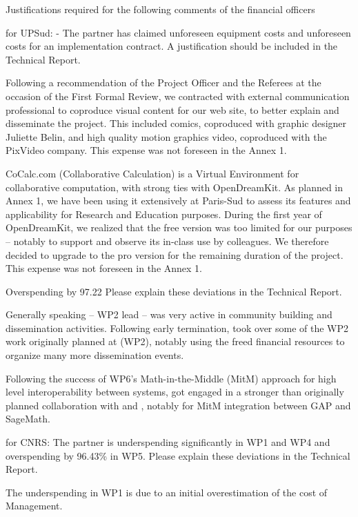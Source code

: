 
Justifications required for the following comments of the financial officers 

for UPSud:
- The partner has claimed unforeseen equipment costs and unforeseen costs for an
implementation contract. A justification should be included in the Technical Report.

Following a recommendation of the Project Officer and the Referees at
the occasion of the First Formal Review, we contracted with external
communication professional to coproduce visual content for our web
site, to better explain and disseminate the project. This included
comics, coproduced with graphic designer Juliette Belin, and high
quality motion graphics video, coproduced with the PixVideo company.
This expense was not foreseen in the Annex 1.

CoCalc.com (Collaborative Calculation) is a Virtual Environment for
collaborative computation, with strong ties with OpenDreamKit. As
planned in Annex 1, we have been using it extensively at Paris-Sud to
assess its features and applicability for Research and Education
purposes. During the first year of OpenDreamKit, we realized that the
free version was too limited for our purposes -- notably to support
and observe its in-class use by colleagues. We therefore decided to
upgrade to the pro version for the remaining duration of the project.
This expense was not foreseen in the Annex 1.

Overspending by 97.22%
Please explain these deviations in the Technical Report.

Generally speaking  -- WP2 lead -- was very active in
community building and dissemination activities. Following
 early termination,  took over some of the WP2
work originally planned at  (WP2), notably using the freed
financial resources to organize many more dissemination events.

Following the success of WP6's Math-in-the-Middle (MitM) approach for
high level interoperability between systems,  got engaged in
a stronger than originally planned collaboration with  and
, notably for MitM integration between GAP and SageMath.

for CNRS:
The partner is underspending significantly in WP1 and WP4 and overspending by 96.43\% in
WP5. Please explain these deviations in the Technical Report.

The underspending in WP1 is due to an initial overestimation of the cost of
Management.

